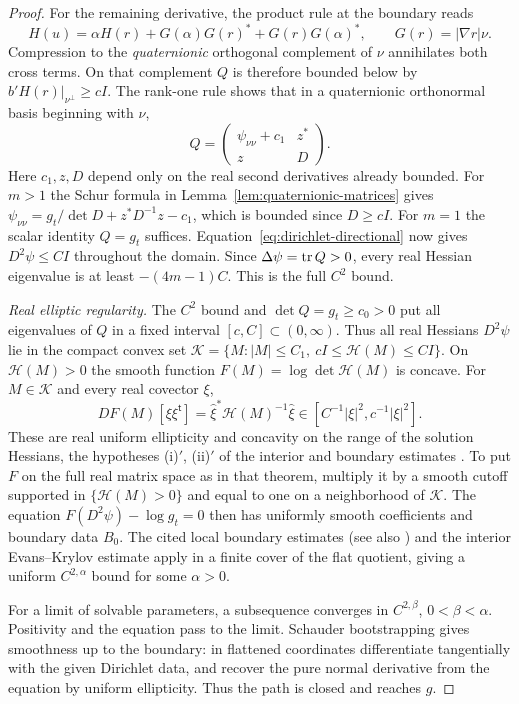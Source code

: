 \begin{proof}
For the remaining derivative, the product rule at the boundary reads
\[
 H(u)=\alpha H(r)+G(\alpha)G(r)^*+G(r)G(\alpha)^*,\qquad
 G(r)=|\nabla r|\nu .
\]
Compression to the \emph{quaternionic} orthogonal complement of $\nu$
annihilates both cross terms. On that complement $Q$ is therefore bounded
below by $b'H(r)|_{\nu^\perp}\ge cI$. The rank-one rule shows that in a
quaternionic orthonormal basis beginning with $\nu$,
\[
 Q=\begin{pmatrix}\psi_{\nu\nu}+c_1&z^*\\z&D\end{pmatrix}.
\]
Here $c_1,z,D$ depend only on the real second derivatives already
bounded. For $m>1$ the Schur formula in
Lemma~\ref{lem:quaternionic-matrices} gives
$\psi_{\nu\nu}=g_t/\det D+z^*D^{-1}z-c_1$, which is bounded since
$D\ge cI$. For $m=1$ the scalar identity $Q=g_t$ suffices.
Equation~\eqref{eq:dirichlet-directional} now gives $D^2\psi\le CI$
throughout the domain. Since $\Delta\psi=\operatorname{tr} Q>0$, every real Hessian
eigenvalue is at least $-(4m-1)C$. This is the full $C^2$ bound.

\emph{Real elliptic regularity.}
The $C^2$ bound and $\det Q=g_t\ge c_0>0$ put all eigenvalues of $Q$
in a fixed interval $[c,C]\subset(0,\infty)$. Thus all real Hessians
$D^2\psi$ lie in the compact convex set
$\mathcal K=\{M:|M|\le C_1,\ cI\le\mathcal H(M)\le CI\}$.
On $\mathcal H(M)>0$ the smooth function $F(M)=\log\det\mathcal H(M)$
is concave. For $M\in\mathcal K$ and every real covector $\xi$,
\[
 DF(M)[\xi\xi^{\mathsf t}]
   =\widehat\xi^*\mathcal H(M)^{-1}\widehat\xi
   \in[C^{-1}|\xi|^2,c^{-1}|\xi|^2].
\]
These are real uniform ellipticity and concavity on the range of the
solution Hessians, the hypotheses (i)$'$, (ii)$'$ of the interior and
boundary estimates \cite[Theorems~17.14 and~$17.26'$]{GilbargTrudinger}. To put
$F$ on the full real matrix space as in that theorem, multiply it by a
smooth cutoff supported in $\{\mathcal H(M)>0\}$ and equal to one on
a neighborhood of $\mathcal K$. The equation
$F(D^2\psi)-\log g_t=0$ then has uniformly smooth coefficients and
boundary data $B_0$. The cited local boundary estimates (see also
\citet{Krylov1983}) and the interior Evans--Krylov estimate
\cite{Evans1982,Krylov1982} apply in a finite
cover of the flat quotient, giving a uniform $C^{2,\alpha}$ bound for
some $\alpha>0$.

For a limit of solvable parameters, a subsequence converges in
$C^{2,\beta}$, $0<\beta<\alpha$. Positivity and the equation pass to
the limit. Schauder bootstrapping gives smoothness up to the boundary:
in flattened coordinates differentiate tangentially with the given
Dirichlet data, and recover the pure normal derivative from the equation
by uniform ellipticity. Thus the path is closed and reaches $g$.


\end{proof}
